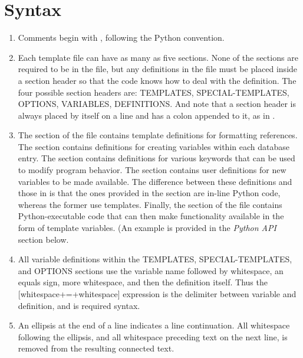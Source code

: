 \documentclass[letterpaper,10pt,english]{sphinxmanual}
\begin{document}
\section{Syntax}
\label{guidelines_for_writing_style_templates:syntax}\begin{enumerate}
\item {} 
Comments begin with \code{\#}, following the Python convention.

\item {} 
Each template file can have as many as five sections. None of the sections are required to be in the file, but any definitions in the file must be placed inside a section header so that the code knows how to deal with the definition. The four possible section headers are: TEMPLATES, SPECIAL-TEMPLATES, OPTIONS, VARIABLES, DEFINITIONS. And note that a section header is always placed by itself on a line and has a colon appended to it, as in .

\item {} 
The  section of the file contains template definitions for formatting references. The  section contains definitions for creating variables within each database entry. The  section contains definitions for various keywords that can be used to modify program behavior. The  section contains user definitions for new variables to be made available. The difference between these definitions and those in  is that the ones provided in the  section are in-line Python code, whereas the former use templates. Finally, the  section of the file contains Python-executable code that can then make functionality available in the form of template variables. (An example is provided in the \emph{Python API} section below.

\item {} 
All variable definitions within the TEMPLATES, SPECIAL-TEMPLATES, and OPTIONS sections use the variable name followed by whitespace, an equals sign, more whitespace, and then the definition itself. Thus the {[}whitespace+=+whitespace{]} expression is the delimiter between variable and definition, and is required syntax.

\item {} 
An ellipsis  at the end of a line indicates a line continuation. All whitespace following the ellipsis, and all whitespace preceding text on the next line, is removed from the resulting connected text.


\end{enumerate}
\end{document}
